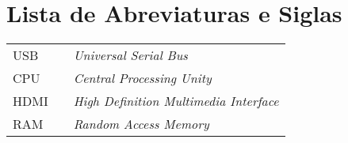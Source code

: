 \chapter*{Lista de Abreviaturas e Siglas}

\begin{tabular}{lll}
  USB     & & {\em Universal Serial Bus} \\
  CPU     & & {\em Central Processing Unity}\\
  HDMI    & & {\em High Definition Multimedia Interface}\\
  RAM     & & {\em Random Access Memory}\\
\end{tabular}
\clearpage